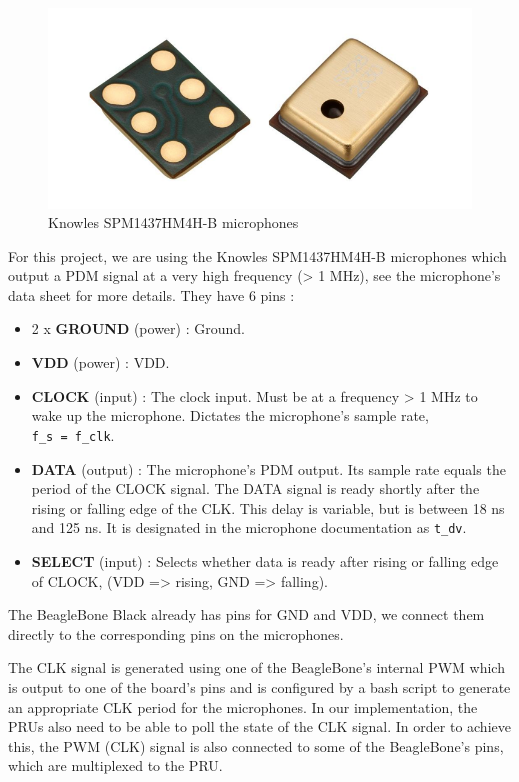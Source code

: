 \documentclass[]{report}
\providecommand{\tightlist}{%
	\setlength{\itemsep}{0pt}\setlength{\parskip}{0pt}}
\begin{document}
\begin{figure}[h]
\centering
\includegraphics[width=0.6\linewidth]{Pictures/mics.png}
\caption{Knowles SPM1437HM4H-B microphones}
\end{figure}

For this project, we are using the Knowles SPM1437HM4H-B microphones
which output a PDM signal at a very high frequency (\textgreater{} 1
MHz), see the microphone's data sheet for more
details. They have 6 pins :

\begin{itemize}
\tightlist
\item
  2 x \textbf{GROUND} (power) : Ground.
\item
  \textbf{VDD} (power) : VDD.
\item
  \textbf{CLOCK} (input) : The clock input. Must be at a frequency
  \textgreater{} 1 MHz to wake up the microphone. Dictates the
  microphone's sample rate, \texttt{f\_s\ =\ f\_clk}.
\item
  \textbf{DATA} (output) : The microphone's PDM output. Its sample rate
  equals the period of the CLOCK signal. The DATA signal is ready shortly
  after the rising or falling edge of the CLK. This delay is variable,
  but is between 18 ns and 125 ns. It is designated in the microphone documentation
  as \texttt{t\_dv}.
\item
  \textbf{SELECT} (input) : Selects whether data is ready after rising
  or falling edge of CLOCK, (VDD =\textgreater{} rising, GND
  =\textgreater{} falling).
\end{itemize}

The BeagleBone Black already has pins for GND and VDD, we connect them directly to the corresponding pins on the microphones.

The CLK signal is generated using one of the BeagleBone's internal PWM which is output to one of the board's pins and is configured by a bash script to generate an appropriate CLK period for the microphones. In our implementation, the PRUs also need to be able to poll the state of the CLK signal. In order to achieve this, the PWM (CLK) signal is also connected to some of the BeagleBone's pins, which are multiplexed to the PRU.
\end{document}
